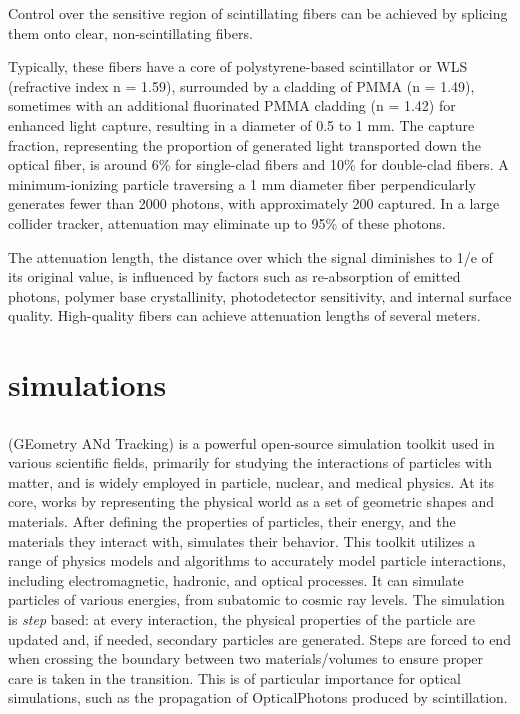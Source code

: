 \begin{refsection}
        Control over the sensitive region of scintillating fibers can be achieved by splicing them onto clear, non-scintillating fibers.

        Typically, these fibers have a core of polystyrene-based scintillator or WLS (refractive index n = 1.59), surrounded by a cladding of PMMA (n = 1.49), sometimes with an additional fluorinated PMMA cladding (n = 1.42) for enhanced light capture, resulting in a diameter of 0.5 to 1 mm. The capture fraction, representing the proportion of generated light transported down the optical fiber, is around 6\% for single-clad fibers and 10\% for double-clad fibers. A minimum-ionizing particle traversing a 1 mm diameter fiber perpendicularly generates fewer than 2000 photons, with approximately 200 captured. In a large collider tracker, attenuation may eliminate up to 95\% of these photons.

        The attenuation length, the distance over which the signal diminishes to 1/e of its original value, is influenced by factors such as re-absorption of emitted photons, polymer base crystallinity, photodetector sensitivity, and internal surface quality. High-quality fibers can achieve attenuation lengths of several meters.
        
\section{\gf simulations}
    \label{sec:muEDM:entrance:sim}
    \subsection{\gf}
        \gf (GEometry ANd Tracking) is a powerful open-source simulation toolkit used in various scientific fields, primarily for studying the interactions of particles with matter, and is widely employed in particle, nuclear, and medical physics. 
        At its core, \gf works by representing the physical world as a set of geometric shapes and materials. 
        After defining the properties of particles, their energy, and the materials they interact with, \gf simulates their behavior. 
        This toolkit utilizes a range of physics models and algorithms to accurately model particle interactions, including electromagnetic, hadronic, and optical processes. It can simulate particles of various energies, from subatomic to cosmic ray levels.
        The simulation is \textit{step} based: at every interaction, the physical properties of the particle are updated and, if needed, secondary particles are generated. 
        Steps are forced to end when crossing the boundary between two materials/volumes to ensure proper care is taken in the transition. 
        This is of particular importance for optical simulations, such as the propagation of OpticalPhotons produced by scintillation.


\end{refsection}
